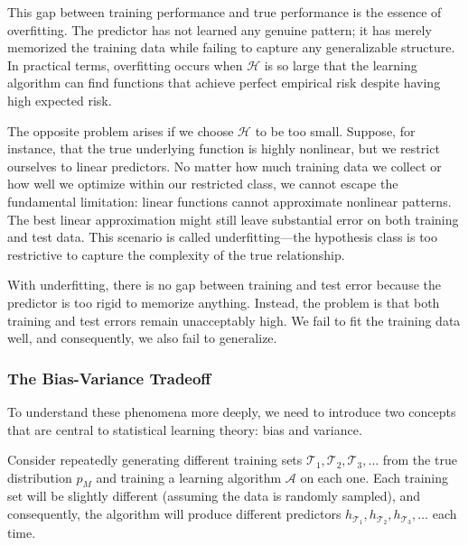 This gap between training performance and true performance is the essence of \alert{overfitting}. The predictor has not learned any genuine pattern; it has merely memorized the training data while failing to capture any generalizable structure. In practical terms, overfitting occurs when $\mathcal{H}$ is so large that the learning algorithm can find functions that achieve perfect empirical risk despite having high expected risk.

\medskip
The opposite problem arises if we choose $\mathcal{H}$ to be too small. Suppose, for instance, that the true underlying function is highly nonlinear, but we restrict ourselves to linear predictors. No matter how much training data we collect or how well we optimize within our restricted class, we cannot escape the fundamental limitation: linear functions cannot approximate nonlinear patterns. The best linear approximation might still leave substantial error on both training and test data. This scenario is called \alert{underfitting}---the hypothesis class is too restrictive to capture the complexity of the true relationship.

With underfitting, there is no gap between training and test error because the predictor is too rigid to memorize anything. Instead, the problem is that both training and test errors remain unacceptably high. We fail to fit the training data well, and consequently, we also fail to generalize.

\subsubsection*{The Bias-Variance Tradeoff}

To understand these phenomena more deeply, we need to introduce two concepts that are central to statistical learning theory: \alert{bias} and \alert{variance}. 

Consider repeatedly generating different training sets $\mathcal{T}_1,  \mathcal{T}_2, \mathcal{T}_3, \ldots$ from the true distribution $p_M$ and training a learning algorithm $\mathcal{A}$ on each one. Each training set will be slightly different (assuming the data is randomly sampled), and consequently, the algorithm will produce different predictors $h_{\mathcal{T}_1}, h_{\mathcal{T}_2}, h_{\mathcal{T}_3}, \ldots$ each time. 

